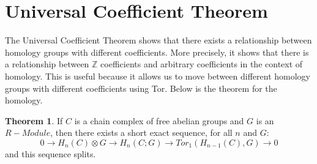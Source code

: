 \documentclass[11pt]{article}
\theoremstyle{definition}
\newtheorem{theorem}{Theorem}[section]
\begin{document}
\section{Universal Coefficient Theorem}
The Universal Coefficient Theorem shows that there exists a relationship between homology groups with different coefficients. More precisely, it shows that there is a relationship between $\mathbb{Z}$ coefficients and arbitrary coefficients in the context of homology. This is useful because it allows us to move between different homology groups with different coefficients using Tor. Below is the theorem for the homology.
\begin{theorem}
If $C$ is a chain complex of free abelian groups and $G$ is an $R-Module$, then there exists a short exact sequence, for all $n$ and $G$: $$0\rightarrow H_n(C)\otimes G \rightarrow H_n(C;G)\rightarrow Tor_1(H_{n-1}(C),G)\rightarrow 0$$ and this sequence splits. 
\end{theorem}
\end{document}
